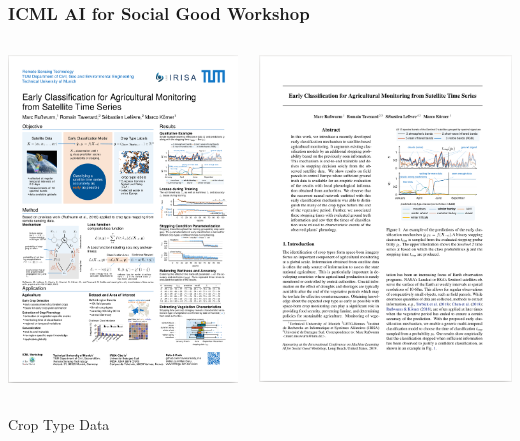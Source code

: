 \begin{frame}
	\frametitle{ICML AI for Social Good Workshop}
	\begin{columns}
	\includegraphics[width=.6\textwidth]{images/AI4SG_Poster}
	
	\includegraphics[width=.6\textwidth]{images/AI4SG_Paper}
	
	\end{columns}
\end{frame}


{
	\begin{frame}[plain]
	
	\vfill
	\Huge\color{white}
	\begin{center}
		\begin{columns}
			\column{.5\textwidth}
			\vspace{7em}
			
			\hfill 
			Crop Type Data
			\column{.5\textwidth}
			
		\end{columns}
	\end{center}
	
	\vfill
\end{frame}
}


